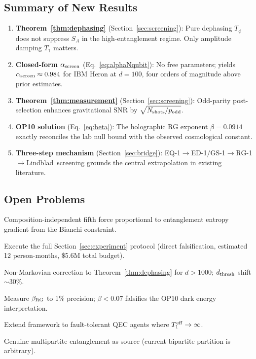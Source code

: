 \documentclass[12pt,letterpaper]{article}
\theoremstyle{definition}
\theoremstyle{remark}
\newcommand{\ascreen}{\alpha_{\rm screen}}
\begin{document}
\subsection{Summary of New Results}

\begin{enumerate}
\item \textbf{Theorem~\ref{thm:dephasing}} (Section~\ref{sec:screening}): Pure dephasing
      $T_\phi$ does not suppress $S_A$ in the high-entanglement regime.
      Only amplitude damping $T_1$ matters.

\item \textbf{Closed-form $\ascreen$} (Eq.~\eqref{eq:alphaNqubit}): No free parameters;
      yields $\ascreen\approx 0.984$ for IBM Heron at $d=100$, four orders of magnitude
      above prior estimates.

\item \textbf{Theorem~\ref{thm:measurement}} (Section~\ref{sec:screening}):
      Odd-parity post-selection enhances gravitational SNR by
      $\sqrt{N_{\rm shots}/p_{\rm odd}}$.

\item \textbf{OP10 solution} (Eq.~\eqref{eq:beta}): The holographic RG exponent
      $\beta = 0.0914$ exactly reconciles the lab null bound with the observed
      cosmological constant.

\item \textbf{Three-step mechanism} (Section~\ref{sec:bridge}): EQ-1$\to$ED-1/GS-1$\to$RG-1$\to$Lindblad~screening grounds the central extrapolation in existing literature.
\end{enumerate}

\subsection{Open Problems}

\begin{description}[noitemsep]
\item[OP8] Composition-independent fifth force proportional to entanglement entropy
           gradient from the Bianchi constraint.
\item[OP11] Execute the full Section~\ref{sec:experiment} protocol (direct
            falsification, estimated 12 person-months, \$5.6M total budget).
\item[OP12] Non-Markovian correction to Theorem~\ref{thm:dephasing} for $d > 1000$;
            $d_{\rm thresh}$ shift $\sim 30\%$.
\item[OP13] Measure $\beta_{\rm RG}$ to 1\% precision; $\beta < 0.07$ falsifies the
            OP10 dark energy interpretation.
\item[OP14] Extend framework to fault-tolerant QEC agents where $T_1^{\rm eff}\to\infty$.
\item[OP15] Genuine multipartite entanglement as source (current bipartite partition is
            arbitrary).
\end{description}
\end{document}
